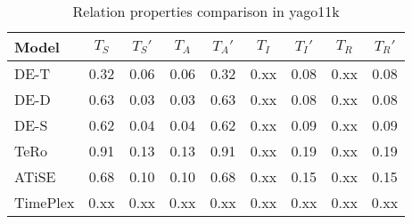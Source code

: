 \begin{table*}[htb]
\centering
\begin{minipage}{0.95\textwidth}
\centering
\caption{Relation properties comparison in yago11k}
\vspace{-3mm}

\begin{tabular}{l|cc|cc|cc|cc}\hline
Model       & $T_S$ & $T_S'$ & $T_A$ & $T_A'$ & $T_I$ & $T_I'$ & $T_R$ & $T_R'$ \\ \hline
DE-T & 0.32 & 0.06 & 0.06 & 0.32 & 0.xx & 0.08 & 0.xx & 0.08 \\ 
DE-D & 0.63 & 0.03 & 0.03 & 0.63 & 0.xx & 0.08 & 0.xx & 0.08 \\ 
DE-S & 0.62 & 0.04 & 0.04 & 0.62 & 0.xx & 0.09 & 0.xx & 0.09 \\ 
TeRo & 0.91 & 0.13 & 0.13 & 0.91 & 0.xx & 0.19 & 0.xx & 0.19 \\ 
ATiSE & 0.68 & 0.10 & 0.10 & 0.68 & 0.xx & 0.15 & 0.xx & 0.15 \\ 
TimePlex & 0.xx & 0.xx & 0.xx & 0.xx & 0.xx & 0.xx & 0.xx & 0.xx \\ 
 \hline
\end{tabular}

\label{fig:relation_properties_yago11k_comparison}
\end{minipage}
\end{table*}

